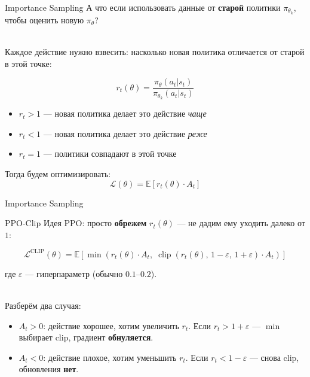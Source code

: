 \documentclass[aspectratio=169,12pt,t,compress]{beamer}
\begin{document}
\begin{frame}{Importance Sampling}
	А что если использовать данные от \textbf{старой} политики $\pi_{\theta_k}$, чтобы оценить новую $\pi_\theta$?

	\\ [0.5em]

	Каждое действие нужно взвесить: насколько новая политика отличается от старой в этой точке:

	$$
		r_t(\theta) = \frac{\pi_\theta(a_t|s_t)}{\pi_{\theta_k}(a_t|s_t)}
	$$

	\begin{itemize}
		\item $r_t > 1$ --- новая политика делает это действие \textit{чаще}
		\item $r_t < 1$ --- новая политика делает это действие \textit{реже}
		\item $r_t = 1$ --- политики совпадают в этой точке
	\end{itemize}

	Тогда будем оптимизировать:
	$$
		\mathcal{L}(\theta) = \mathbb{E}\left[r_t(\theta) \cdot A_t\right]
	$$
\end{frame}

\begin{frame}{Importance Sampling}
\end{frame}

\begin{frame}{PPO-Clip}
	Идея PPO: просто \textbf{обрежем} $r_t(\theta)$ --- не дадим ему уходить далеко от $1$:

	$$
		\mathcal{L}^{\text{CLIP}}(\theta) = \mathbb{E}\left[\min\!\left(r_t(\theta)\cdot A_t,\;\operatorname{clip}\!\left(r_t(\theta),\, 1{-}\varepsilon,\, 1{+}\varepsilon\right)\cdot A_t\right)\right]
	$$

	где $\varepsilon$ --- гиперпараметр (обычно $0.1$--$0.2$).

	\\ [0.5em]

	Разберём два случая:

	\begin{itemize}
		\item $A_t > 0$: действие хорошее, хотим увеличить $r_t$. Если $r_t > 1+\varepsilon$ --- $\min$ выбирает clip, градиент \textbf{обнуляется}.
		\item $A_t < 0$: действие плохое, хотим уменьшить $r_t$. Если $r_t < 1-\varepsilon$ --- снова clip, обновления \textbf{нет}.
	\end{itemize}
\end{frame}
\end{document}
